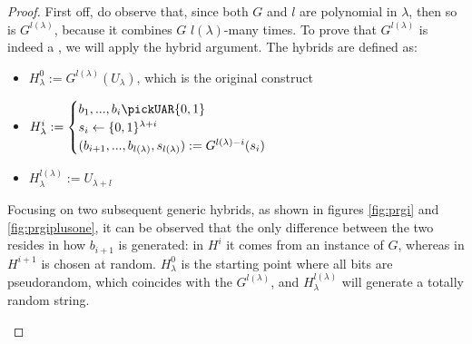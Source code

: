 \begin{proof}

    First off, do observe that, since both $G$ and $l$ are polynomial in $\lambda$, then so is $G^{l(\lambda)}$, because it combines $G$ $l(\lambda)$-many times. To prove that $G^{l(\lambda)}$ is indeed a \prg, we will apply the hybrid argument. The hybrids are defined as:
    \begin{itemize}
        \item $H_{\lambda}^{0} := G^{l(\lambda)}(U_{\lambda})$, which is the original construct
        \item $H_{\lambda}^{i} :=
            \begin{cases}
                b_1 , ..., b_{i} \pickUAR \{0,1\} \\
                s_{i} \leftarrow \{0,1\}^{\lambda+i} \\
                (b_{i+1}, ..., b_{l(\lambda)}, s_{l(\lambda)}) := G^{l(\lambda)-i}(s_{i})
            \end{cases}$
        \item $H_{\lambda}^{l(\lambda)} := U_{\lambda + l}$
    \end{itemize}

    Focusing on two subsequent generic hybrids, as shown in figures \ref{fig:prgi} and \ref{fig:prgiplusone}, it can be observed that the only difference between the two resides in how $b_{i + 1}$ is generated: in $H^i$ it comes from an instance of $G$, whereas in $H^{i + 1}$ is chosen at random. $H_\lambda^0$ is the starting point where all bits are pseudorandom, which coincides with the $G^{l(\lambda)}$, and $H_\lambda^{l(\lambda)}$ will generate a totally random string.

    \begin{figure}[ht]

\end{figure}
\end{proof}
